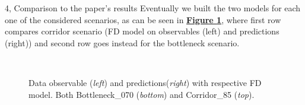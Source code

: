 \documentclass[10pt,a4paper]{article}
\begin{document}
\begin{task}{4, Comparison to the paper's results}
Eventually we built the two models for each one of the considered scenarios, as can be seen in \textbf{\hyperref[fig:various-fd-comparison]{Figure \ref{fig:various-fd-comparison}}}, where first row compares corridor scenario (FD model on observables (left) and predictions (right)) and second row goes instead for the bottleneck scenario. 

\begin{figure}[h]
    \centering
    \hfill
    \\
    \hfill
    \caption{Data observable (\textit{left}) and predictions(\textit{right}) with respective FD model. Both Bottleneck\_070 (\textit{bottom}) and Corridor\_85 (\textit{top}).}
    \label{fig:various-fd-comparison}
\end{figure}


\end{task}
\end{document}
